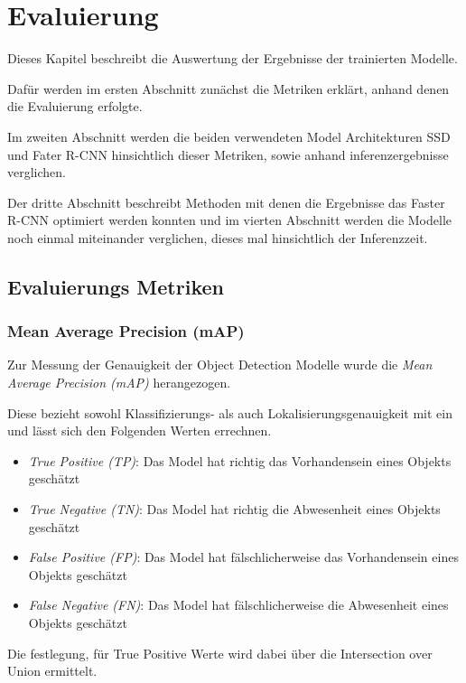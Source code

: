 \chapter{Evaluierung}\label{kap:eval}

Dieses Kapitel beschreibt die Auswertung der
Ergebnisse der trainierten Modelle.

Dafür werden im ersten Abschnitt zunächst die Metriken 
erklärt, anhand denen die Evaluierung erfolgte. 

Im zweiten Abschnitt werden die beiden verwendeten Model
Architekturen SSD und Fater R-CNN hinsichtlich dieser Metriken, sowie anhand 
inferenzergebnisse verglichen.

Der dritte Abschnitt beschreibt Methoden mit denen 
die Ergebnisse das Faster R-CNN optimiert werden konnten und im 
vierten Abschnitt werden die Modelle noch einmal miteinander
verglichen, dieses mal hinsichtlich der Inferenzzeit.

\section{Evaluierungs Metriken}\label{sec:metricen}

\subsection*{Mean Average Precision (mAP)}

Zur Messung der Genauigkeit der Object Detection Modelle 
wurde die \textit{Mean Average Precision (mAP)} herangezogen.

Diese bezieht sowohl Klassifizierungs- als auch Lokalisierungsgenauigkeit 
mit ein und lässt sich den Folgenden Werten errechnen.

\begin{itemize}
  \item \textit{True Positive (TP)}: Das Model hat richtig das Vorhandensein eines Objekts geschätzt
  \item \textit{True Negative (TN)}: Das Model hat richtig die Abwesenheit eines Objekts geschätzt
  \item \textit{False Positive (FP)}: Das Model hat fälschlicherweise das Vorhandensein eines Objekts geschätzt
  \item \textit{False Negative (FN)}: Das Model hat fälschlicherweise die Abwesenheit eines Objekts geschätzt
\end{itemize}

Die festlegung, für True Positive Werte wird dabei über die 
Intersection over Union ermittelt.

